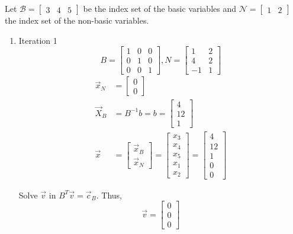 \documentclass[a4paper,10pt]{article}
\begin{document}
\begin{enumerate}
\begin{enumerate}
        {\color{blue} 
            Let $\mathcal{B} = \begin{bmatrix} 3 & 4 & 5 \end{bmatrix}$ be the index set of the basic variables and $\mathcal{N} = \begin{bmatrix} 1 & 2 \end{bmatrix}$ the index set of the non-basic variables.
            \begin{enumerate}
                \item Iteration 1
                    \[ B = \begin{bmatrix}1 & 0 & 0 \\ 0 & 1 & 0 \\ 0 & 0 & 1\end{bmatrix}, N =  \begin{bmatrix}1 & 2 \\ 4 & 2 \\ -1 & 1 \end{bmatrix}\]
                    \begin{align}
                        \vec{x}_N &= \begin{bmatrix} 0 \\ 0 \end{bmatrix} \\
                        \vec{X}_B &= B^{-1}b = b = \begin{bmatrix} 4 \\ 12 \\ 1 \end{bmatrix} \\
                        \vec{x} &= \begin{bmatrix} \vec{x}_B \\ \vec{x}_N \end{bmatrix}
                        = \begin{bmatrix} x_3 \\ x_4 \\ x_5 \\ x_1 \\ x_2 \end{bmatrix} 
                        = \begin{bmatrix} 4 \\ 12 \\ 1 \\ 0 \\ 0 \end{bmatrix} 
                    \end{align}

                    Solve $\vec{v}$ in $B^T\vec{v} = \vec{c}_B$. Thus, 
                    \[
                        \vec{v} = \begin{bmatrix} 0 \\ 0 \\ 0 \end{bmatrix}
                    \]


\end{enumerate}}
\end{enumerate}
\end{enumerate}
\end{document}

